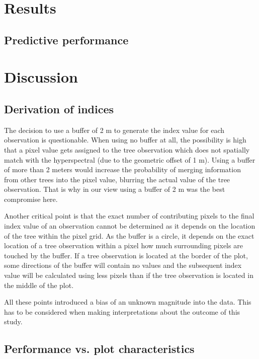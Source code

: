 \documentclass[review]{elsarticle}
\begin{document}
\section{Results}

\subsection{Predictive performance}


\section{Discussion}

\subsection{Derivation of indices}

\noindent The decision to use a buffer of 2 m to generate the index value for each observation is questionable.
When using no buffer at all, the possibility is high that a pixel value gets assigned to the tree observation which does not spatially match with the hyperspectral (due to the geometric offset of 1 m).
Using a buffer of more than 2 meters would increase the probability of merging information from other trees into the pixel value, blurring the actual value of the tree observation.
That is why in our view using a buffer of 2 m was the best compromise here.

Another critical point is that the exact number of contributing pixels to the final index value of an observation cannot be determined as it depends on the location of the tree within the pixel grid.
As the buffer is a circle, it depends on the exact location of a tree observation within a pixel how much surrounding pixels are touched by the buffer.
If a tree observation is located at the border of the plot, some directions of the buffer will contain no values and the subsequent index value will be calculated using less pixels than if the tree observation is located in the middle of the plot.

All these points introduced a bias of an unknown magnitude into the data.
This has to be considered when making interpretations about the outcome of this study.

\subsection{Performance vs. plot characteristics}
\end{document}
